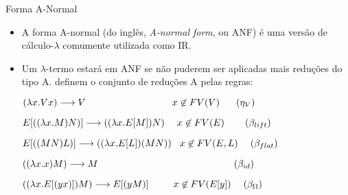 \begin{frame}{Forma A-Normal}
    \begin{itemize}
        \item A forma A-normal (do inglês, \textit{A-normal form}, ou ANF) é uma versão de cálculo-$\lambda$ comumente utilizada como IR.

        \item Um $\lambda$-termo estará em ANF se não puderem ser aplicadas mais reduções do tipo A.  definem o conjunto de reduções A pelas regras:
        \begin{flushleft}
            $(\lambda x.V x) \longrightarrow V  \hspace{21ex} x \not\in FV(V) \hspace{4ex} (\eta_{V})$
            
            $E[((\lambda x.M) N)] \longrightarrow ((\lambda x.E[M]) N)  \hspace{3ex} x \not\in FV(E) \hspace{5ex} (\beta_{lift})$
    
            $E[((M N) L)] \longrightarrow ((\lambda x.E[L]) (M N))  \hspace{2ex} x \not\in FV(E,L) \hspace{3ex} (\beta_{flat})$
    
            $((\lambda x.x) M) \longrightarrow M \hspace{33ex} (\beta_{id})$
    
            $((\lambda x.E[(y x)]) M) \longrightarrow E[(y M)] \hspace{6ex} x \not\in FV(E[y]) \hspace{3ex} (\beta_{\Omega})$
        \end{flushleft}
    \end{itemize}
\end{frame}